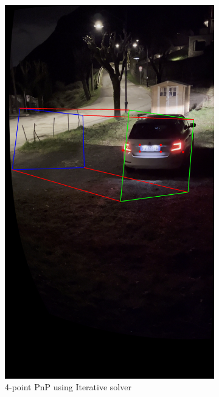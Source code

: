 \begin{figure}[h]
    \centering
    \hspace*{\fill}
    \begin{subfigure}[b]{0.30\textwidth}
        \includegraphics[width=\textwidth]{Images/method4/bbox_4pts_iterative.jpg}
        \caption{4-point PnP using Iterative solver}
    \end{subfigure}
    \hfill
    \begin{subfigure}[b]{0.30\textwidth}

\end{subfigure}
\end{figure}
